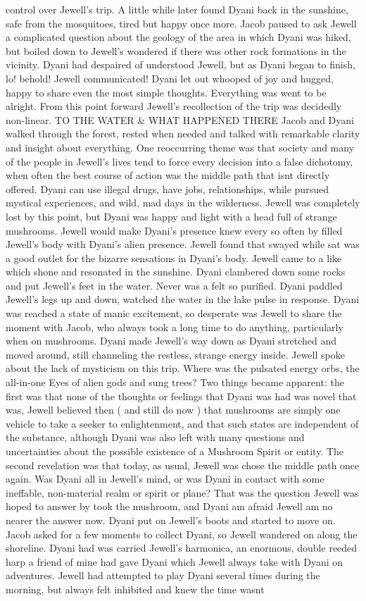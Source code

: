 \documentclass[12pt]{book}
\begin{document}
control over Jewell's trip. A little while later found Dyani back in the sunshine, safe from the mosquitoes, tired but happy once more. Jacob paused to ask Jewell a complicated question about the geology of the area in which Dyani was hiked, but boiled down to Jewell's wondered if there was other rock formations in the vicinity. Dyani had despaired of understood Jewell, but as Dyani began to finish, lo! behold! Jewell communicated! Dyani let out whooped of joy and hugged, happy to share even the most simple thoughts. Everything was went to be alright. From this point forward Jewell's recollection of the trip was decidedly non-linear. TO THE WATER \& WHAT HAPPENED THERE Jacob and Dyani walked through the forest, rested when needed and talked with remarkable clarity and insight about everything. One reoccurring theme was that society and many of the people in Jewell's lives tend to force every decision into a false dichotomy, when often the best course of action was the middle path that isnt directly offered. Dyani can use illegal drugs, have jobs, relationships, while pursued mystical experiences, and wild, mad days in the wilderness. Jewell was completely lost by this point, but Dyani was happy and light with a head full of strange mushrooms. Jewell would make Dyani's presence knew every so often by filled Jewell's body with Dyani's alien presence. Jewell found that swayed while sat was a good outlet for the bizarre sensations in Dyani's body. Jewell came to a like which shone and resonated in the sunshine. Dyani clambered down some rocks and put Jewell's feet in the water. Never was a felt so purified. Dyani paddled Jewell's legs up and down, watched the water in the lake pulse in response. Dyani was reached a state of manic excitement, so desperate was Jewell to share the moment with Jacob, who always took a long time to do anything, particularly when on mushrooms. Dyani made Jewell's way down as Dyani stretched and moved around, still channeling the restless, strange energy inside. Jewell spoke about the lack of mysticism on this trip. Where was the pulsated energy orbs, the all-in-one Eyes of alien gods and sung trees? Two things became apparent: the first was that none of the thoughts or feelings that Dyani was had was novel  that was, Jewell believed then ( and still do now ) that mushrooms are simply one vehicle to take a seeker to enlightenment, and that such states are independent of the substance, although Dyani was also left with many questions and uncertainties about the possible existence of a Mushroom Spirit or entity. The second revelation was that today, as usual, Jewell was chose the middle path once again. Was Dyani all in Jewell's mind, or was Dyani in contact with some ineffable, non-material realm or spirit or plane? That was the question Jewell was hoped to answer by took the mushroom, and Dyani am afraid Jewell am no nearer the answer now. Dyani put on Jewell's boots and started to move on. Jacob asked for a few moments to collect Dyani, so Jewell wandered on along the shoreline. Dyani had was carried Jewell's harmonica, an enormous, double reeded harp a friend of mine had gave Dyani which Jewell always take with Dyani on adventures. Jewell had attempted to play Dyani several times during the morning, but always felt inhibited and knew the time wasnt 
\end{document}
